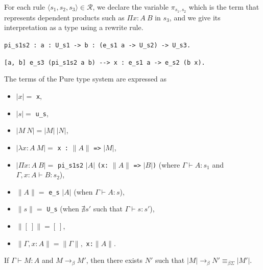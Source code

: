 \documentclass[english]{lipics}
\newcommand\lst[1]{{\rm \lstinline{#1}}}
\begin{document}
\medskip

\noindent
For each rule $\langle s_1, s_2, s_3 \rangle
\in \mathcal R$, we declare the variable
$\pi_{s_1,s_2}$ which is the term that represents dependent products such as $\Pi x : A~B$ in $s_3$, and we give its interpretation as a type using a rewrite rule.

\noindent
\lst{pi_s1s2 : a : U_s1 -> b : (e_s1 a -> U_s2) -> U_s3.}

\noindent
\lst{[a, b] e_s3 (pi_s1s2 a b) --> x : e_s1 a -> e_s2 (b x).}

\begin{definition}
The terms of the Pure type system are expressed as
\begin{itemize}
\item $|x| =$ \lst{x},
\item $|s| =$ \lst{u_s},
\item $|M~N| = |M|~|N|$,
\item $|\lambda x:A~M| =$ \lst{x :} $\|A\|$ \lst{=>} $|M|$,
\item $|\Pi x:A~B| =$ \lst{pi_s1s2} $|A|$ \lst{(x:} $\|A\|$
\lst{=>} $|B|$\lst{)}
(where $\Gamma \vdash A : s_1$ and $\Gamma, x:A \vdash B : s_2$),
\end{itemize}


\begin{itemize}
\item $\|A\| =$  \lst{e_s} $|A|$ (when $\Gamma \vdash A : s$),
\item $\|s\| =$ \lst{U_s} (when $\nexists s'$ such that $\Gamma \vdash s : s'$),
\end{itemize}


\begin{itemize}
\item $\|[~]\| = [~]$,
\item $\|\Gamma, x:A\|  =  \|\Gamma\|,$ \lst{x:}$\|A\|$.
\end{itemize}
\end{definition}

\begin{lemma}
If $\Gamma \vdash M : A$ and $M \longrightarrow_\beta M'$, then there
exists $N'$ such that $|M| \longrightarrow_\beta N' \equiv_{\beta\Sigma} |M'|$.
\end{lemma}

\end{document}
